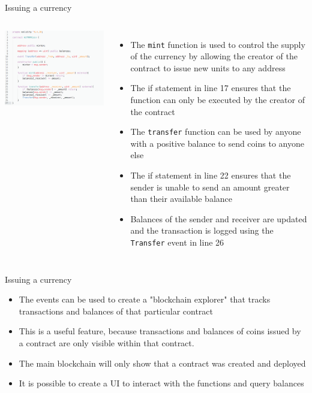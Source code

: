 \documentclass[10pt]{beamer}
\begin{document}
\begin{frame}{Issuing a currency}
	\begin{columns}
	    \includegraphics  [scale=0.3]{Images/contract_new}

	    \begin{itemize}
			\item The \texttt{mint} function is used to control the supply of the currency by allowing the creator of the contract to issue new units to any address
			\item The if statement in line 17 ensures that the function can only be executed by the creator of the contract
			\item The \texttt{transfer} function can be used by anyone with a positive balance to send coins to anyone else
			\item The if statement in line 22 ensures that the sender is unable to send an amount greater than their available balance
			\item Balances of the sender and receiver are updated and the transaction is logged using the \texttt{Transfer} event in line 26
	    \end{itemize}
	\end{columns}
\end{frame}


\begin{frame}{Issuing a currency}
	\begin{itemize}
		\item The events can be used to create a "blockchain explorer" that tracks transactions and balances of that particular contract
		\item This is a useful feature, because transactions and balances of coins issued by a contract are only visible within that contract.
		\item The main blockchain will only show that a contract was created and deployed
		\item It is possible to create a UI to interact with the functions and query balances
	\end{itemize}
\end{frame}
\end{document}
